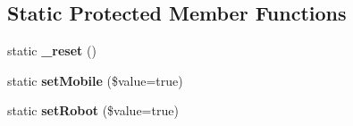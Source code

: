 \subsection*{Static Protected Member Functions}
\begin{DoxyCompactItemize}
\item 
\hypertarget{class_browser_ac35f5ce4d7a49fb10dfa29eeedabaa9a}{
static {\bfseries \_\-reset} ()}
\label{class_browser_ac35f5ce4d7a49fb10dfa29eeedabaa9a}

\item 
\hypertarget{class_browser_aef2c5e09459789ea9d7c0f2eb9e08aaf}{
static {\bfseries setMobile} (\$value=true)}
\label{class_browser_aef2c5e09459789ea9d7c0f2eb9e08aaf}

\item 
\hypertarget{class_browser_ad5274a71a39530b9def3093a40cab978}{
static {\bfseries setRobot} (\$value=true)}
\label{class_browser_ad5274a71a39530b9def3093a40cab978}


\end{DoxyCompactItemize}
